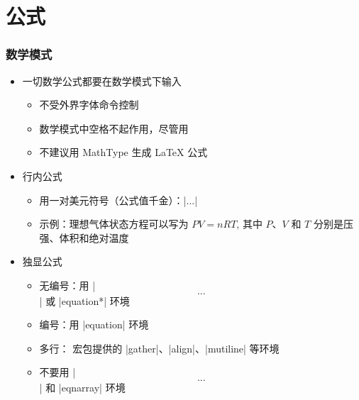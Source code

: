 \section{公式}

\begin{frame}[fragile]
\frametitle{数学模式}
\begin{itemize}
  \item 一切数学公式都要在数学模式下输入
    \begin{itemize}
      \item 不受外界字体命令控制
      \item 数学模式中空格不起作用，尽管用
      \item \alert{不建议用 MathType 生成 \LaTeX{} 公式}
    \end{itemize}
  \item 行内公式
    \begin{itemize}
      \item 用一对美元符号（公式值千金）：|$...$|
      \item 示例：理想气体状态方程可以写为 \alert{$PV=nRT$}, 其中
            \alert{$P$}、\alert{$V$} 和 \alert{$T$} 分别是压强、体积和绝对温度
    \end{itemize}
  \item 独显公式
    \begin{itemize}
      \item 无编号：用 |\[...\]| 或 |equation*| 环境
      \item 编号：用 |equation| 环境
      \item 多行： 宏包提供的 |gather|、|align|、|mutiline| 等环境
      \item \alert{不要用} |$$...$$| \alert{和} |eqnarray| \alert{环境}
    \end{itemize}
\end{itemize}
\end{frame}


